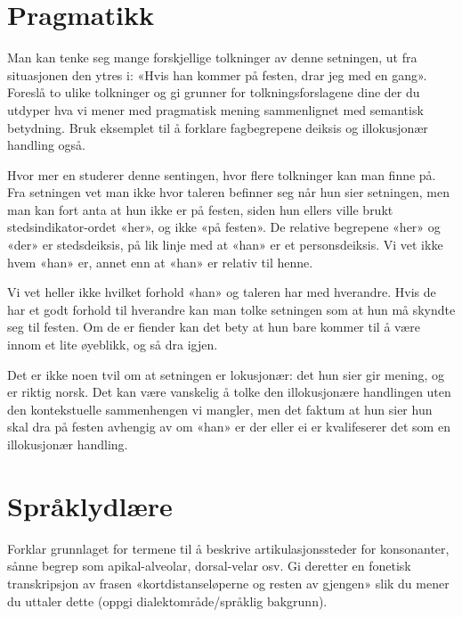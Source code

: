 \documentclass{myassignment}
\begin{document}
	\section{Pragmatikk}

	\begin{problem}
	Man kan tenke seg mange forskjellige tolkninger av denne setningen, ut fra situasjonen den ytres i: «Hvis han kommer på festen, drar jeg med en gang». Foreslå to ulike tolkninger og gi grunner for tolkningsforslagene dine der du utdyper hva vi mener med pragmatisk mening sammenlignet med semantisk betydning. Bruk eksemplet til å forklare fagbegrepene deiksis og illokusjonær handling også.
	\end{problem}

	Hvor mer en studerer denne sentingen, hvor flere tolkninger kan man finne på. Fra setningen vet man ikke hvor taleren befinner seg når hun sier setningen, men man kan fort anta at hun ikke er på festen, siden hun ellers ville brukt stedsindikator-ordet «her», og ikke «på festen». De relative begrepene «her» og «der» er stedsdeiksis, på lik linje med at «han» er et personsdeiksis. Vi vet ikke hvem «han» er, annet enn at «han» er relativ til henne.

	Vi vet heller ikke hvilket forhold «han» og taleren har med hverandre. Hvis de har et godt forhold til hverandre kan man tolke setningen som at hun må skyndte seg til festen. Om de er fiender kan det bety at hun bare kommer til å være innom et lite øyeblikk, og så dra igjen.

	Det er ikke noen tvil om at setningen er lokusjonær: det hun sier gir mening, og er riktig norsk. Det kan være vanskelig å tolke den illokusjonære handlingen uten den kontekstuelle sammenhengen vi mangler, men det faktum at hun sier hun skal dra på festen avhengig av om «han» er der eller ei er kvalifeserer det som en illokusjonær handling.

	\section{Språklydlære}
	\begin{problem}
	Forklar grunnlaget for termene til å beskrive artikulasjonssteder for konsonanter, sånne begrep som apikal-alveolar, dorsal-velar osv.  Gi deretter en fonetisk transkripsjon av frasen «kortdistanseløperne og resten av gjengen» slik du mener du uttaler dette (oppgi dialektområde/språklig bakgrunn).
	\end{problem}
\end{document}
